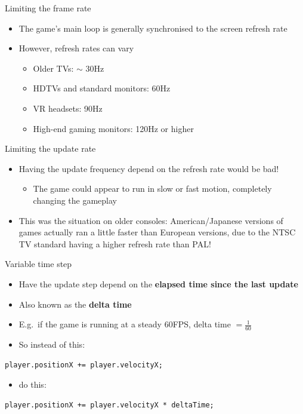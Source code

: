 \begin{frame}{Limiting the frame rate}
    \begin{itemize}
        \pause\item The game's main loop is generally synchronised to the screen refresh rate 
        \pause\item However, refresh rates can vary
            \begin{itemize}
                \pause\item Older TVs: $\sim$ 30Hz
                \pause\item HDTVs and standard monitors: 60Hz
                \pause\item VR headsets: 90Hz
                \pause\item High-end gaming monitors: 120Hz or higher
            \end{itemize}
    \end{itemize}
\end{frame}

\begin{frame}{Limiting the update rate}
    \begin{itemize}
        \pause\item Having the update frequency depend on the refresh rate would be bad!
            \begin{itemize}
                \pause\item The game could appear to run in slow or fast motion,
                    completely changing the gameplay 
            \end{itemize}
        \pause\item This was the situation on older consoles:
            American/Japanese versions of games actually ran a little faster
            than European versions,
            due to the NTSC TV standard having a higher refresh rate than PAL!
    \end{itemize}
\end{frame}

\begin{frame}[fragile]{Variable time step}
    \begin{itemize}
        \pause\item Have the update step depend on the \textbf{elapsed time since the last update} 
        \pause\item Also known as the \textbf{delta time} 
        \pause\item E.g.\ if the game is running at a steady 60FPS, delta time $= \frac{1}{60}$
        \pause\item So instead of this:
    \end{itemize}
    \begin{lstlisting}
player.positionX += player.velocityX;
    \end{lstlisting}
    \begin{itemize}
        \pause\item do this:
    \end{itemize}
    \begin{lstlisting}
player.positionX += player.velocityX * deltaTime;
    \end{lstlisting}
\end{frame}

